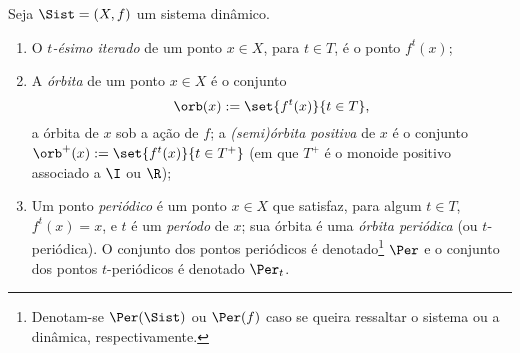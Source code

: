 \begin{definition}
Seja $\Sist=(X,f)$ um sistema dinâmico.
	\begin{enumerate}
	\item O \emph{$t$-ésimo iterado} de um ponto $x \in X$, para $t \in T$, é o ponto $f^t(x)$;
	\item A \emph{órbita} de um ponto $x \in X$ é o conjunto
	\begin{equation*}
	\orb(x) := \set{f^t(x)}{t \in T},
	\end{equation*}
a órbita de $x$ sob a ação de $f$; a \emph{(semi)órbita positiva} de $x$ é o conjunto $\orb^+(x) := \set{f^t(x)}{t \in T^+}$ (em que $T^+$ é o monoide positivo associado a $\I$ ou $\R$);
	\item Um ponto \emph{periódico} é um ponto $x \in X$ que satisfaz, para algum $t \in T$, $f^t(x)=x$, e $t$ é um \emph{período} de $x$; sua órbita é uma \emph{órbita periódica} (ou $t$-periódica). O conjunto dos pontos periódicos é denotado\footnote{Denotam-se $\Per(\Sist)$ ou $\Per(f)$ caso se queira ressaltar o sistema ou a dinâmica, respectivamente.} $\Per$ e o conjunto dos pontos $t$-periódicos é denotado $\Per_t$.
	\end{enumerate}
\end{definition}

\begin{comment}
Claramente, quando $T=\I^+$, vale que, para todos $t,t' \in \I^+$ tais que $t \dleq t'$,
	\begin{equation*}
	\Per_{t'} \subseteq \Per_t,
	\end{equation*}
e que
	\begin{equation*}
	\Per = \bigcup_{t \in T^+} \Per_t.
	\end{equation*}
Ainda,
	\begin{equation*}
	\Per_t := \set{x \in X}{f^t(x)=x}.
	\end{equation*}
Uma definição explícita do período de $x$ é o número
	\begin{equation*}
	\min\nolimits_{\dleq}\set{t' \in \I^+}{f^{t'}(x)=x},
	\end{equation*}
em que $\min_{\dleq}$ representa o mínimo em relação à ordem de divisão $\dleq$. Essa definição é interessante porque nesse caso $\Per_0$ seria o conjunto dos pontos não periódicos, visto que ele é o menor número de $\I^+$ com relação à ordem de divisão tal que $f^t(x)=x$ quando $x$ não é periódico. Esse valor não é $0$ no caso de pontos periódicos pois todo número divide $0$. O conjunto dos períodos de um ponto é um subgrupo de $T^+$.
\end{comment}

